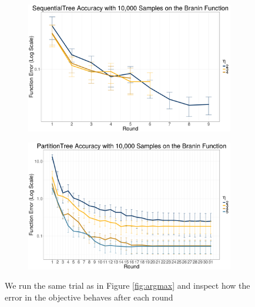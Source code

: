 \documentclass[11pt]{article}
\begin{document}
\begin{figure}

  \begin{subfigure}[t]{.45\textwidth}
    \includegraphics[width=\textwidth]{seq_tree_error_per_round.png}
  \end{subfigure} \hfill
  \begin{subfigure}[t]{.45\textwidth}
    \includegraphics[width=\textwidth]{part_tree_error_per_round.png}
  \end{subfigure}
\caption{We run the same trial as in Figure \ref{fig:argmax} and inspect how the error in the objective behaves after each round}
\label{fig:error}
\end{figure}
\end{document}
